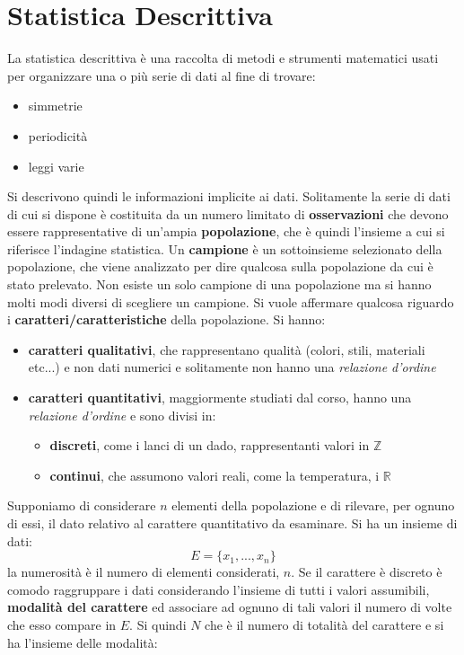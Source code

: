 \documentclass[a4paper,12pt, oneside]{book}
\begin{document}
\chapter{Statistica Descrittiva}
La statistica descrittiva è una raccolta di metodi e strumenti matematici usati per organizzare una o più serie di dati al fine di trovare:
\begin{itemize}
\item simmetrie
\item periodicità
\item leggi varie
\end{itemize}
Si descrivono quindi le informazioni implicite ai dati. 
Solitamente la serie di dati di cui si dispone è costituita da un numero limitato di \textbf{osservazioni} che devono essere rappresentative di un'ampia \textbf{popolazione}, che è quindi l'insieme a cui si riferisce l'indagine statistica. Un \textbf{campione} è un sottoinsieme selezionato della popolazione, che viene analizzato per dire qualcosa sulla popolazione da cui è stato prelevato. Non esiste un solo campione di una popolazione ma si hanno molti modi diversi di scegliere un campione. Si vuole affermare qualcosa riguardo i \textbf{caratteri/caratteristiche} della popolazione. Si hanno:
\begin{itemize}
\item \textbf{caratteri qualitativi}, che rappresentano qualità (colori, stili, materiali etc...) e non dati numerici e solitamente non hanno una \textit{relazione d'ordine}
\item \textbf{caratteri quantitativi}, maggiormente studiati dal corso, hanno una \textit{relazione d'ordine} e sono divisi in:
\begin{itemize}
\item \textbf{discreti}, come i lanci di un dado, rappresentanti valori in $\mathbb{Z}$
\item \textbf{continui}, che assumono valori reali, come la temperatura, i $\mathbb{R}$
\end{itemize}
\end{itemize}
Supponiamo di considerare $n$ elementi della popolazione e di rilevare, per
ognuno di essi, il dato relativo al carattere quantitativo da esaminare. Si ha un insieme di dati:
$$E=\{x_1,...,x_n\}$$
la numerosità è il numero di elementi considerati, $n$. Se il carattere è discreto è comodo raggruppare i dati considerando
l'insieme di tutti i valori assumibili, \textbf{modalità del carattere} ed associare ad ognuno di tali valori il numero di volte che esso compare in $E$. Si quindi $N$ che è il numero di totalità del carattere e si ha l'insieme delle modalità:
\end{document}
